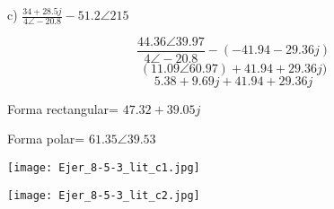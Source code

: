 \documentclass[a4paper, 11pt]{article}
\begin{document}
c) $\frac{34+28.5j}{4\angle-20.8}-51.2\angle215$

\begin{equation*}
\frac{44.36\angle39.97}{4\angle-20.8}-(-41.94-29.36j)
\end{equation*}
\begin{equation*}
(11.09\angle60.97)+41.94+29.36j)
\end{equation*}
\begin{equation*}
5.38+9.69j+41.94+29.36j
\end{equation*}

Forma rectangular= $47.32+39.05j$ 

Forma polar= $61.35\angle39.53$

\texttt{[image: Ejer\_8-5-3\_lit\_c1.jpg]}

\texttt{[image: Ejer\_8-5-3\_lit\_c2.jpg]}
\end{document}
